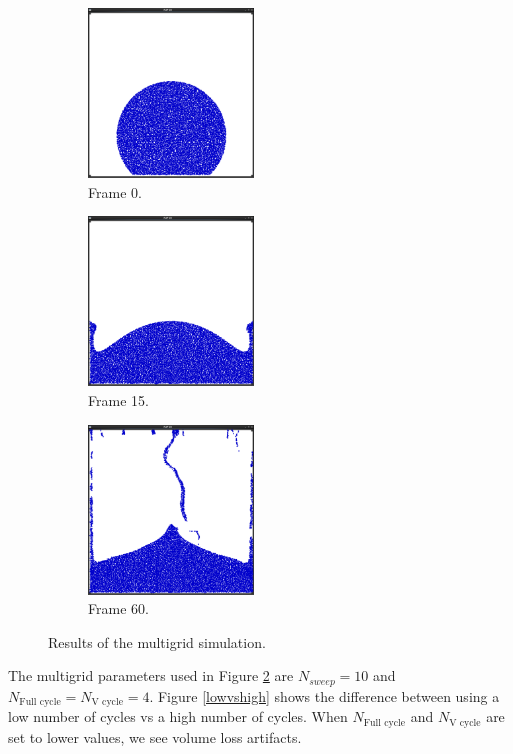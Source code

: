 \begin{figure}[ht!]
\centering

\begin{subfigure}[]{0.3\textwidth}
\includegraphics[height=45mm]{png/multigrid0.png}
\caption{Frame 0.}
\label{initialshapae}

\end{subfigure}
\begin{subfigure}[]{0.3\textwidth}
\includegraphics[height=45mm]{png/multigrid1.png}
\caption{Frame 15.}
\end{subfigure}

\begin{subfigure}[]{0.3\textwidth}
\includegraphics[height=45mm]{png/multigrid4.png}
\caption{Frame 60.}
\end{subfigure}

\caption{Results of the multigrid simulation.}
\label{simresult}
\end{figure}
\noindent
The multigrid parameters used in Figure \ref{simresult} are $N_{sweep} = 10$ and $N_{\text{Full cycle}} = N_\text{V cycle} = 4$. Figure \ref{lowvshigh} shows the difference between using a low number of cycles vs a high number of cycles. When $N_{\text{Full cycle}}$ and $N_\text{V cycle}$ are set to lower values, we see volume loss artifacts.

